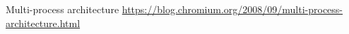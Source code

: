 

\cleardoublepage

\nocite{*}
\begin{thebibliography}{9}
   Multi-process architecture \url{https://blog.chromium.org/2008/09/multi-process-architecture.html}
\end{thebibliography}

